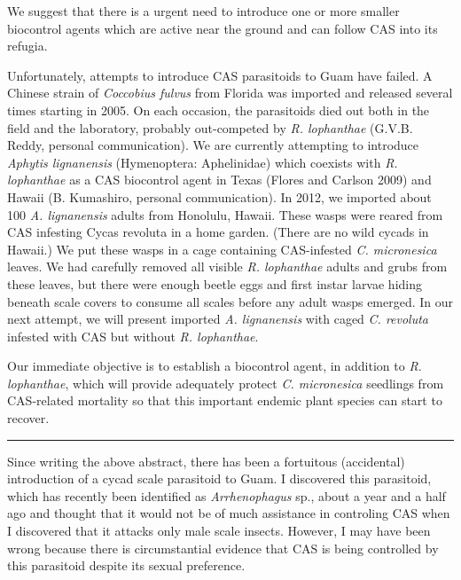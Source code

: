 \documentclass[12pt,oneside,english]{scrbook}
\begin{document}
We suggest that there is a urgent need to introduce one or more smaller biocontrol
agents which are active near the ground and can follow CAS into its refugia.

Unfortunately, attempts to introduce CAS parasitoids to Guam have failed. A Chinese
strain of \textit{Coccobius fulvus} from Florida was imported and released several times
starting in 2005. On each occasion, the parasitoids died out both in the field and the
laboratory, probably out-competed by \textit{R. lophanthae} (G.V.B. Reddy, personal
communication). We are currently attempting to introduce \textit{Aphytis lignanensis}
(Hymenoptera: Aphelinidae) which coexists with \textit{R. lophanthae} as a CAS biocontrol
agent in Texas (Flores and Carlson 2009) and Hawaii (B. Kumashiro, personal
communication). In 2012, we imported about 100 \textit{A. lignanensis} adults from Honolulu,
Hawaii. These wasps were reared from CAS infesting Cycas revoluta in a home
garden. (There are no wild cycads in Hawaii.) We put these wasps in a cage containing
CAS-infested \textit{C. micronesica} leaves. We had carefully removed all visible \textit{R.
lophanthae} adults and grubs from these leaves, but there were enough beetle eggs
and first instar larvae hiding beneath scale covers to consume all scales before any
adult wasps emerged. In our next attempt, we will present imported \textit{A. lignanensis} with
caged \textit{C. revoluta} infested with CAS but without \textit{R. lophanthae}.

Our immediate objective is to establish a biocontrol agent, in addition to \textit{R. lophanthae},
which will provide adequately protect \textit{C. micronesica} seedlings from CAS-related
mortality so that this important endemic plant species can start to recover.
\hrule

Since writing the above abstract, there has been a fortuitous (accidental) introduction of a cycad scale parasitoid to Guam. I discovered this parasitoid, which has recently been identified as \textit{Arrhenophagus} sp., about a year and a half ago and thought that it would not be of much assistance in controling CAS when I discovered that it attacks only male scale insects. However, I may have been wrong because there is circumstantial evidence that CAS is being controlled by this parasitoid despite its sexual preference. 
\end{document}
